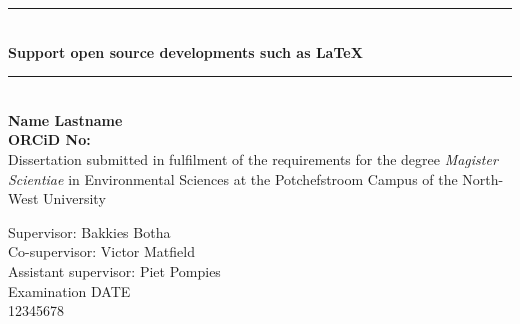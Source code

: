 
\begin{titlepage}
\begingroup
{\selectfont 


\newcommand{\HRule}{\rule{\linewidth}{0.0mm}}
\center %

\HRule \\[0.5cm]
{\fontsize{32}{10}\selectfont \bfseries Support open source developments such
as \LaTeX}\\[0.2cm]
\HRule \\[1.25cm]

{\huge \bfseries Name Lastname}\\[0.2cm]
{\huge \bfseries ORCiD No:} \\[2.20cm]

{\LARGE Dissertation submitted in fulfilment of the requirements for
the degree {\color{cyan!85} \textit{Magister Scientiae}} in
{\color{cyan!85} {Environmental Sciences}} at the Potchefstroom Campus
of the North-West University}\\[1.70cm]

\raggedright 
\LARGE Supervisor: \hspace{24mm} Bakkies Botha \\
\LARGE Co-supervisor: \hspace{16mm} Victor Matfield \\
\LARGE Assistant supervisor: \hspace{1.5mm} Piet Pompies\\[1.5cm]

\LARGE Examination DATE\\
\LARGE 12345678\\

\vspace*{\fill}
\noindent
\begin{center}
\end{center}

}
\endgroup
\end{titlepage}
\restoregeometry
